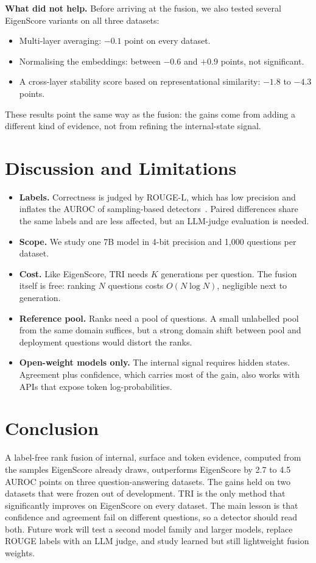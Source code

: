 \documentclass[journal]{IEEEtran}
\begin{document}
\textbf{What did not help.} Before arriving at the fusion, we also tested several EigenScore variants on all three datasets:
\begin{itemize}
\item Multi-layer averaging: $-0.1$ point on every dataset.
\item Normalising the embeddings: between $-0.6$ and $+0.9$ points, not significant.
\item A cross-layer stability score based on representational similarity: $-1.8$ to $-4.3$ points.
\end{itemize}
These results point the same way as the fusion: the gains come from adding a different kind of evidence, not from refining the internal-state signal.

\section{Discussion and Limitations}
\begin{itemize}
\item \textbf{Labels.} Correctness is judged by ROUGE-L, which has low precision and inflates the AUROC of sampling-based detectors~\cite{janiak2025}. Paired differences share the same labels and are less affected, but an LLM-judge evaluation is needed.
\item \textbf{Scope.} We study one 7B model in 4-bit precision and 1,000 questions per dataset.
\item \textbf{Cost.} Like EigenScore, TRI needs $K$ generations per question. The fusion itself is free: ranking $N$ questions costs $O(N\log N)$, negligible next to generation.
\item \textbf{Reference pool.} Ranks need a pool of questions. A small unlabelled pool from the same domain suffices, but a strong domain shift between pool and deployment questions would distort the ranks.
\item \textbf{Open-weight models only.} The internal signal requires hidden states. Agreement plus confidence, which carries most of the gain, also works with APIs that expose token log-probabilities.
\end{itemize}

\section{Conclusion}
A label-free rank fusion of internal, surface and token evidence, computed from the samples EigenScore already draws, outperforms EigenScore by 2.7 to 4.5 AUROC points on three question-answering datasets. The gains held on two datasets that were frozen out of development. TRI is the only method that significantly improves on EigenScore on every dataset. The main lesson is that confidence and agreement fail on different questions, so a detector should read both. Future work will test a second model family and larger models, replace ROUGE labels with an LLM judge, and study learned but still lightweight fusion weights.
\end{document}
